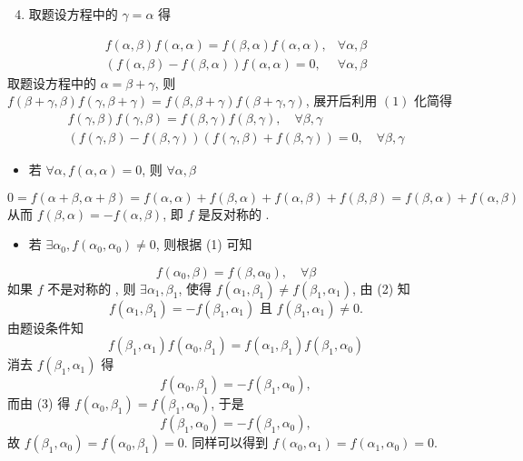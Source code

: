 \documentclass[10pt]{article}
\begin{document}
\begin{enumerate}
  \setcounter{enumi}{3}
  \item  取题设方程中的  $\gamma=\alpha$  得 
\end{enumerate}
$$
\begin{array}{cc}
f(\alpha, \beta) f(\alpha, \alpha)=f(\beta, \alpha) f(\alpha, \alpha), & \forall \alpha, \beta \\
(f(\alpha, \beta)-f(\beta, \alpha)) f(\alpha, \alpha)=0, & \forall \alpha, \beta
\end{array}
$$
 取题设方程中的  $\alpha=\beta+\gamma$,  则  $f(\beta+\gamma, \beta) f(\gamma, \beta+\gamma)=f(\beta, \beta+\gamma) f(\beta+\gamma, \gamma)$,  展开后利用  $(1)$  化简得 
$$
\begin{gathered}
f(\gamma, \beta) f(\gamma, \beta)=f(\beta, \gamma) f(\beta, \gamma), \quad \forall \beta, \gamma \\
(f(\gamma, \beta)-f(\beta, \gamma))(f(\gamma, \beta)+f(\beta, \gamma))=0, \quad \forall \beta, \gamma
\end{gathered}
$$

\begin{itemize}
  \item  若  $\forall \alpha, f(\alpha, \alpha)=0$,  则  $\forall \alpha, \beta$
\end{itemize}
$$
0=f(\alpha+\beta, \alpha+\beta)=f(\alpha, \alpha)+f(\beta, \alpha)+f(\alpha, \beta)+f(\beta, \beta)=f(\beta, \alpha)+f(\alpha, \beta)
$$
 从而  $f(\beta, \alpha)=-f(\alpha, \beta)$,  即  $f$  是反对称的 .

\begin{itemize}
  \item  若  $\exists \alpha_{0}, f\left(\alpha_{0}, \alpha_{0}\right) \neq 0$,  则根据  (1)  可知 
\end{itemize}
$$
f\left(\alpha_{0}, \beta\right)=f\left(\beta, \alpha_{0}\right), \quad \forall \beta
$$
 如果  $f$  不是对称的 ,  则  $\exists \alpha_{1}, \beta_{1}$,  使得  $f\left(\alpha_{1}, \beta_{1}\right) \neq f\left(\beta_{1}, \alpha_{1}\right)$,  由  (2)  知 
$$
f\left(\alpha_{1}, \beta_{1}\right)=-f\left(\beta_{1}, \alpha_{1}\right) \text { 且 } f\left(\beta_{1}, \alpha_{1}\right) \neq 0 .
$$
 由题设条件知 
$$
f\left(\beta_{1}, \alpha_{1}\right) f\left(\alpha_{0}, \beta_{1}\right)=f\left(\alpha_{1}, \beta_{1}\right) f\left(\beta_{1}, \alpha_{0}\right)
$$
 消去  $f\left(\beta_{1}, \alpha_{1}\right)$  得 
$$
f\left(\alpha_{0}, \beta_{1}\right)=-f\left(\beta_{1}, \alpha_{0}\right),
$$
 而由  (3)  得  $f\left(\alpha_{0}, \beta_{1}\right)=f\left(\beta_{1}, \alpha_{0}\right)$, 于是 
$$
f\left(\beta_{1}, \alpha_{0}\right)=-f\left(\beta_{1}, \alpha_{0}\right),
$$
 故  $f\left(\beta_{1}, \alpha_{0}\right)=f\left(\alpha_{0}, \beta_{1}\right)=0$.  同样可以得到  $f\left(\alpha_{0}, \alpha_{1}\right)=f\left(\alpha_{1}, \alpha_{0}\right)=0$.
\end{document}
